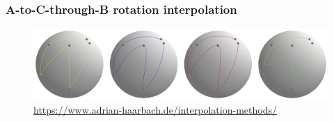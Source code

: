 \documentclass{beamer}
\begin{document}
\begin{frame}
\frametitle{A-to-C-through-B rotation interpolation}
\begin{figure}
    \centering
    \includegraphics[width=1\textwidth]{assets/higher_order_interp_orientation.png}
	\caption*{\url{https://www.adrian-haarbach.de/interpolation-methods/}}
\end{figure}

\end{frame}



\end{document}
